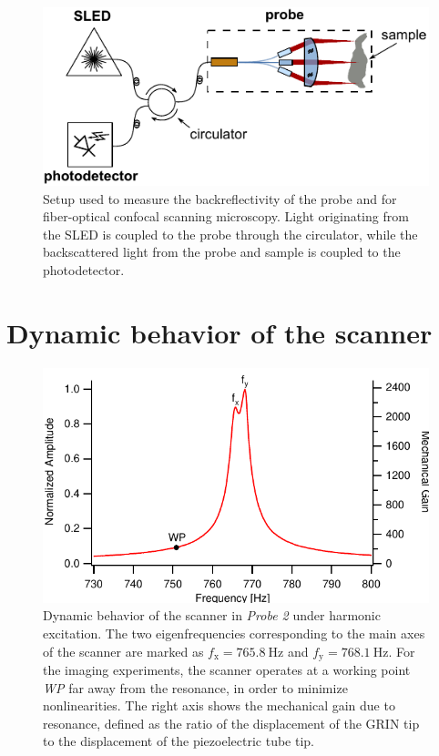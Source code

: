 \begin{figure}[h!]\centering \includegraphics[width=12cm]{figures/50_Measurements/conf/setup/confSetup.pdf}
      \caption{Setup used to measure the backreflectivity of the probe and for fiber-optical confocal scanning microscopy. Light originating from the SLED is coupled to the probe through the circulator, while the backscattered light from the probe and sample is coupled to the photodetector.}
      \label{fig:confSetup}
\end{figure}

\section{Dynamic behavior of the scanner}


\begin{figure}[h!]\centering \includegraphics{figures/50_Measurements/bode/bodeGain.pdf}
      \caption{Dynamic behavior of the scanner in \textit{Probe 2} under harmonic excitation. The two eigenfrequencies corresponding to the main axes of the scanner are marked as $f_\mathrm{x} = \SI{765.8}{\hertz}$ and $f_\mathrm{y} = \SI{768.1}{\hertz}$. For the imaging experiments, the scanner operates at a working point \textit{WP} far away from the resonance, in order to minimize nonlinearities.
      The right axis shows the mechanical gain due to resonance, defined as the ratio of the displacement of the GRIN tip to the displacement of the piezoelectric tube tip.}
      \label{fig:bode}
\end{figure}


